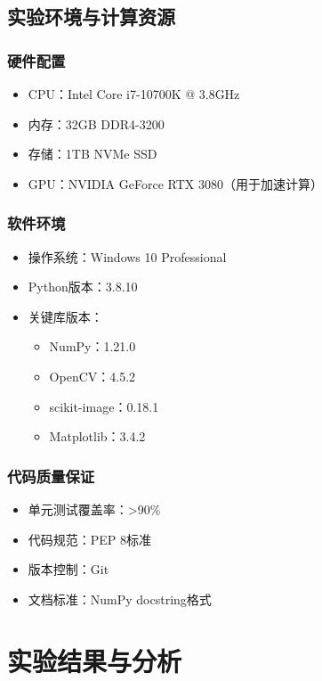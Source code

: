 \documentclass[a4paper,12pt]{ctexart}
\begin{document}
\subsection{实验环境与计算资源}

\subsubsection{硬件配置}
\begin{itemize}
    \item CPU：Intel Core i7-10700K @ 3.8GHz
    \item 内存：32GB DDR4-3200
    \item 存储：1TB NVMe SSD
    \item GPU：NVIDIA GeForce RTX 3080（用于加速计算）
\end{itemize}

\subsubsection{软件环境}
\begin{itemize}
    \item 操作系统：Windows 10 Professional
    \item Python版本：3.8.10
    \item 关键库版本：
    \begin{itemize}
        \item NumPy：1.21.0
        \item OpenCV：4.5.2
        \item scikit-image：0.18.1
        \item Matplotlib：3.4.2
    \end{itemize}
\end{itemize}

\subsubsection{代码质量保证}
\begin{itemize}
    \item 单元测试覆盖率：>90\%
    \item 代码规范：PEP 8标准
    \item 版本控制：Git
    \item 文档标准：NumPy docstring格式
\end{itemize}

\section{实验结果与分析}
\end{document}
